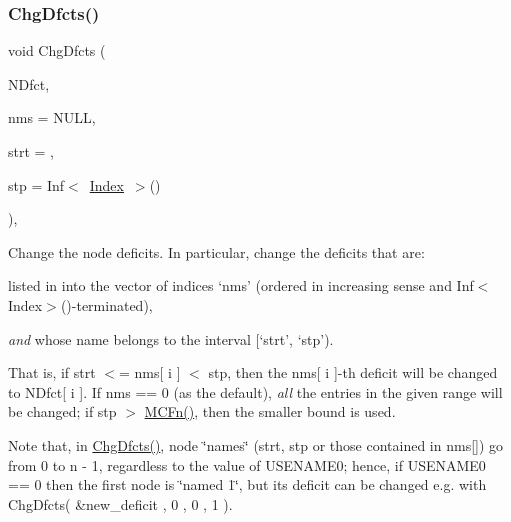 \subsubsection{\texorpdfstring{Chg\+Dfcts()}{ChgDfcts()}}
{\footnotesize\ttfamily void Chg\+Dfcts (\begin{DoxyParamCaption}\item[{\mbox{\hyperlink{class_m_c_f_class_ad325f3193dbba0ddef1da4e72d29eda6}{c\+F\+Row}}}]{N\+Dfct,  }\item[{\mbox{\hyperlink{class_m_c_f_class_a81575b2d4e4d5636b17170432150ae69}{c\+Index\+\_\+\+Set}}}]{nms = {\ttfamily NULL},  }\item[{\mbox{\hyperlink{class_m_c_f_class_a76aaabb20535c51a2752b93f6c38fe54}{c\+Index}}}]{strt = {},  }\item[{\mbox{\hyperlink{class_m_c_f_class_ad53d6229d7ec28555a9c9c2fd9abf773}{Index}}}]{stp = {\ttfamily Inf$<$~\mbox{\hyperlink{class_m_c_f_class_ad53d6229d7ec28555a9c9c2fd9abf773}{Index}}~$>$()} }\end{DoxyParamCaption})\hspace{0.3cm}{\ttfamily [override]}, {\ttfamily [virtual]}}

Change the node deficits. In particular, change the deficits that are\+:


\begin{DoxyItemize}
\item listed in into the vector of indices `nms' (ordered in increasing sense and Inf$<$\+Index$>$()-\/terminated),
\item {\itshape and} whose name belongs to the interval \mbox{[}`strt', `stp').
\end{DoxyItemize}

That is, if strt $<$= nms\mbox{[} i \mbox{]} $<$ stp, then the nms\mbox{[} i \mbox{]}-\/th deficit will be changed to N\+Dfct\mbox{[} i \mbox{]}. If nms == 0 (as the default), {\itshape all} the entries in the given range will be changed; if stp $>$ \mbox{\hyperlink{class_m_c_f_class_a6438187f454e795c03a850bfab31be84}{M\+C\+Fn()}}, then the smaller bound is used.

Note that, in \mbox{\hyperlink{class_m_c_f_cplex_aa45a772ac26eddf9fa9e3f2991b71cc4}{Chg\+Dfcts()}}, node \char`\"{}names\char`\"{} (strt, stp or those contained in nms\mbox{[}\mbox{]}) go from 0 to n -\/ 1, regardless to the value of U\+S\+E\+N\+A\+M\+E0; hence, if U\+S\+E\+N\+A\+M\+E0 == 0 then the first node is \char`\"{}named 1\char`\"{}, but its deficit can be changed e.\+g. with Chg\+Dfcts( \&new\+\_\+deficit , 0 , 0 , 1 ).

